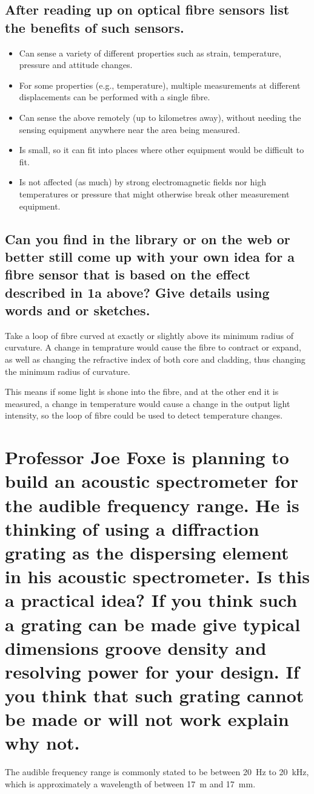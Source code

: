 \documentclass[a4paper]{scrartcl}
\begin{document}
\subsection{After reading up on optical fibre sensors list the benefits of such sensors.}
\begin{itemize}
    \item Can sense a variety of different properties such as strain, temperature, pressure and attitude changes.
    \item For some properties (e.g., temperature), multiple measurements at different displacements can be performed with a single fibre.
    \item Can sense the above remotely (up to kilometres away), without needing the sensing equipment anywhere near the area being measured.
    \item Is small, so it can fit into places where other equipment would be difficult to fit.
    \item Is not affected (as much) by strong electromagnetic fields nor high temperatures or pressure that might otherwise break other measurement equipment.
\end{itemize}

\subsection{Can you find in the library or on the web or better still come up with your own idea for a fibre sensor that is based on the effect described in 1a above? Give details using words and or sketches.}
Take a loop of fibre curved at exactly or slightly above its minimum radius of curvature. A change in temprature would cause the fibre to contract or expand, as well as changing the refractive index of both core and cladding, thus changing the minimum radius of curvature.

This means if some light is shone into the fibre, and at the other end it is measured, a change in temperature would cause a change in the output light intensity, so the loop of fibre could be used to detect temperature changes.

\section{Professor Joe Foxe is planning to build an acoustic spectrometer for the audible frequency range. He is thinking of using a diffraction grating as the dispersing element in his acoustic spectrometer. Is this a practical idea? If you think such a grating can be made give typical dimensions groove density and resolving power for your design. If you think that such grating cannot be made or will not work explain why not.}
The audible frequency range is commonly stated to be between \SI{20}{\hertz} to \SI{20}{\kilo\hertz}, which is approximately a wavelength of between \SI{17}{\metre} and \SI{17}{\milli\metre}.
\end{document}
